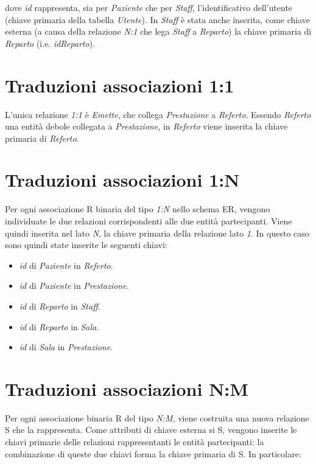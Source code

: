 \documentclass[paper=a4, fontsize=11pt,x11names]{report}
\begin{document}
dove \textit{id} rappresenta, sia per \textit{Paziente} che per \textit{Staff}, l'identificativo dell'utente (chiave primaria della tabella \textit{Utente}). In \textit{Staff} è stata anche inserita, come chiave esterna (a causa della relazione \textit{N:1} che lega \textit{Staff} a \textit{Reparto}) la chiave primaria di \textit{Reparto} (i.e. \textit{idReparto}). 

\section{Traduzioni associazioni 1:1}
L'unica relazione \textit{1:1} è \textit{Emette}, che collega \textit{Prestazione} a \textit{Referto}. Essendo \textit{Referto} una entità debole collegata a \textit{Prestazione}, in \textit{Referto} viene inserita la chiave primaria di \textit{Referto}. 

\section{Traduzioni associazioni 1:N}
Per ogni associazione R binaria del tipo \textit{1:N} nello schema ER, vengono individuate le due relazioni corrispondenti alle due entità partecipanti. Viene quindi inserita nel lato \textit{N}, la chiave primaria della relazione lato \textit{1}. In questo caso sono quindi state inserite le seguenti chiavi:
\begin{itemize}
\item \textit{id} di \textit{Paziente} in \textit{Referto}.
\item \textit{id} di \textit{Paziente} in \textit{Prestazione}.
\item \textit{id} di \textit{Reparto} in \textit{Staff}.
\item \textit{id} di \textit{Reparto} in \textit{Sala}.
\item \textit{id} di \textit{Sala} in \textit{Prestazione}.
\end{itemize}

\section{Traduzioni associazioni N:M}
Per ogni associazione binaria R del tipo \textit{N:M}, viene costruita una nuova relazione S che la rappresenta. Come attributi di chiave esterna si S, vengono inserite le chiavi primarie delle relazioni rappresentanti le entità partecipanti: la combinazione di queste due chiavi forma la chiave primaria di S. In particolare:
\end{document}
